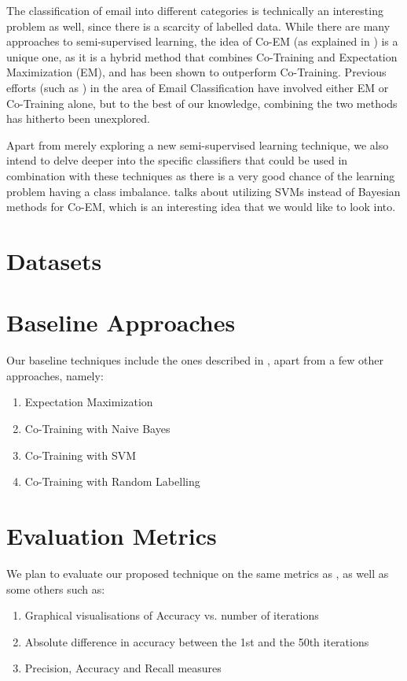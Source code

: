 The classification of email into different categories is technically an interesting problem as well, since there is a scarcity of labelled data. While there are many approaches to semi-supervised learning, the idea of Co-EM (as explained in \cite{duck}) is a unique one, as it is a hybrid method that combines Co-Training and Expectation Maximization (EM), and has been shown to outperform Co-Training. Previous efforts (such as \cite{dog}) in the area of Email Classification have involved either EM or Co-Training alone, but to the best of our knowledge, combining the two methods has hitherto been unexplored.

Apart from merely exploring a new semi-supervised learning technique, we also intend to delve deeper into the specific classifiers that could be used in combination with these techniques as there is a very good chance of the learning problem having a class imbalance. \cite{coemsvl} talks about utilizing SVMs instead of Bayesian methods for Co-EM, which is an interesting idea that we would like to look into.

\section{Datasets}

\section{Baseline Approaches}

Our baseline techniques include the ones described in \cite{duck}, apart from a few other approaches, namely:

\begin{enumerate}
\item 
    Expectation Maximization
\item
    Co-Training with Naive Bayes
\item
    Co-Training with SVM
\item
    Co-Training with  Random Labelling
\end{enumerate}

\section{Evaluation Metrics}

We plan to evaluate our proposed technique on the same metrics as \cite{duck}, as well as some others such as:

\begin{enumerate}
\item 
    Graphical visualisations of Accuracy vs. number of iterations
\item
    Absolute difference in accuracy between the 1st and the 50th iterations
\item
    Precision, Accuracy and Recall measures
\end{enumerate}

